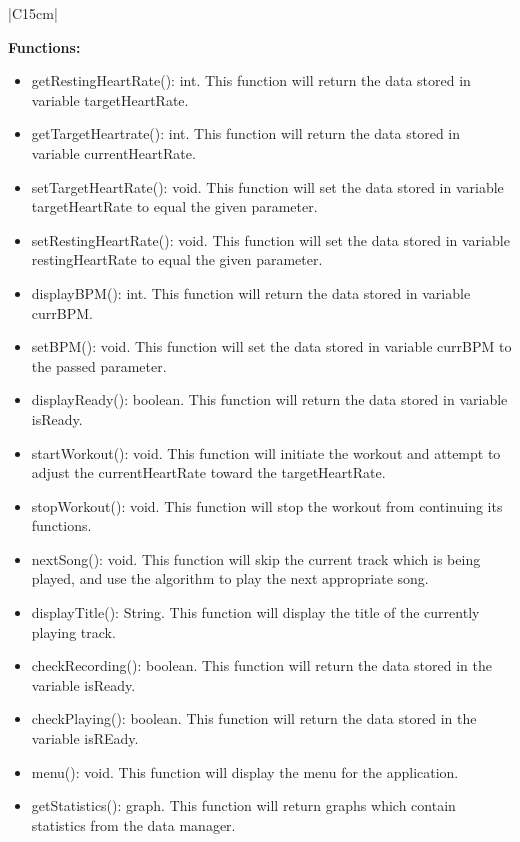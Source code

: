 \documentclass[letterpaper,english, 12pt]{scrreprt}
\begin{document}
\begin{center}
	\begin{tabular}{|C{15cm}|}
			\begin{flushleft}
				\textbf{Functions: } \\
			\end{flushleft}
				\begin{itemize}
					\item getRestingHeartRate(): int. This function will return the data stored in variable targetHeartRate.
					\item getTargetHeartrate(): int. This function will return the data stored in variable currentHeartRate.
					\item setTargetHeartRate(): void. This function will set the data stored in variable targetHeartRate to equal the given parameter.
					\item setRestingHeartRate(): void. This function will set the data stored in variable restingHeartRate to equal the given parameter.
					\item displayBPM(): int. This function will return the data stored in variable currBPM.
					\item setBPM(): void. This function will set the data stored in variable currBPM to the passed parameter.
					\item displayReady(): boolean. This function will return the data stored in variable isReady.
					\item startWorkout(): void. This function will initiate the workout and attempt to adjust the currentHeartRate toward the targetHeartRate.
					\item stopWorkout(): void. This function will stop the workout from continuing its functions.
					\item nextSong(): void. This function will skip the current track which is being played, and use the algorithm to play the next appropriate song.
					\item displayTitle(): String. This function will display the title of the currently playing track.
					\item checkRecording(): boolean. This function will return the data stored in the variable isReady.
					\item checkPlaying(): boolean. This function will return the data stored in the variable isREady.
					\item menu(): void. This function will display the menu for the application.
					\item getStatistics(): graph. This function will return graphs which contain statistics from the data manager.

\end{itemize}
\end{tabular}
\end{center}
\end{document}
